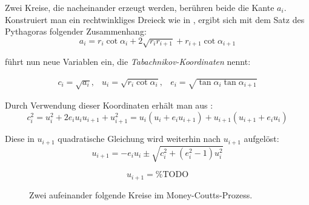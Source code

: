 Zwei Kreise, die nacheinander erzeugt werden, berühren beide die Kante $a_i$.
Konstruiert man ein rechtwinkliges Dreieck wie in ,
ergibt sich mit dem Satz des Pythagoras folgender Zusammenhang:
\begin{equation}
    a_i = r_i\cot\alpha_i + 2\sqrt{r_i r_{i+1}} +r_{i+1}\cot\alpha_{i+1}
    \label{mcp:two-circles}
\end{equation}

\citet{Taba2000} führt nun neue Variablen ein, die \citet{Troub2000} \emph{Tabachnikov-Koordinaten} nennt:

\begin{equation}
    \begin{array}{ccc}
        c_i = \sqrt{a_i}, & u_i = \sqrt{r_i \cot\alpha_i}, & e_i = \sqrt{\tan\alpha_i \tan\alpha_{i+1}}
    \end{array}
    \label{mcp:taba-coordinates}
\end{equation}

Durch Verwendung dieser Koordinaten erhält man aus :
\begin{equation}
    c_i^2 = u_i^2 + 2 e_i u_i u_{i+1} + u_{i+1}^2
    = u_i (u_i + e_i u_{i+1}) +u_{i+1} (u_{i+1} + e_i u_i)
\end{equation}

Diese in $u_{i+1}$ quadratische Gleichung wird weiterhin nach $u_{i+1}$ aufgelöst:
\begin{equation*}
    u_{i+1} = - e_i u_i \pm \sqrt{c_i^2 + (e_i^2 - 1) u_i^2}
\end{equation*}

\begin{equation}
    u_{i+1} = \text{\% TODO}
    \label{mcp:iteration-equation}
\end{equation}

\begin{figure}[htbp]
    
    \caption{Zwei aufeinander folgende Kreise im Money-Coutts-Prozess.}
    \label{fig:mcp:two-circles}
\end{figure}


